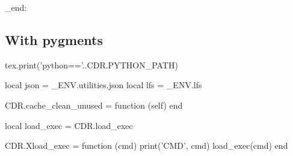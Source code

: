 \group_end:
%
\ExplSyntaxOff


\subsection{With pygments}

\begin{luacode}

tex.print('python=='..CDR.PYTHON_PATH)

local json = _ENV.utilities.json
local lfs   = _ENV.lfs

CDR.cache_clean_unused = function (self)
end

local load_exec = CDR.load_exec

CDR.Xload_exec = function (cmd)
print('CMD', cmd)
load_exec(cmd)
end
\end{luacode}


